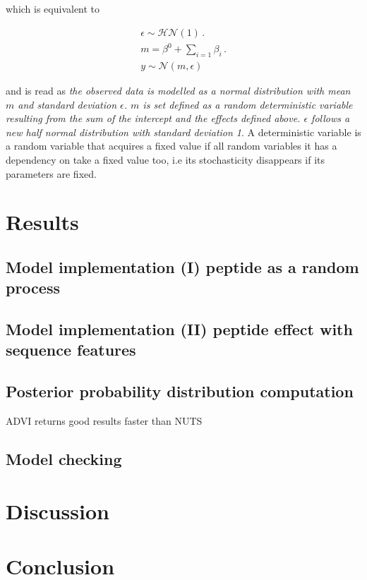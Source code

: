 which is equivalent to

\begin{align}
\nonumber \epsilon \sim \mathcal{HN}(1) \,. \\ 
m = \beta^0 + \sum_{i=1} \beta_i \,. \\ 
\nonumber y \sim \mathcal{N}(m, \epsilon)
\end{align}

and is read as \textit{the observed data is modelled as a normal distribution with mean $m$ and standard deviation $\epsilon$. $m$ is set defined as a random deterministic variable resulting from the sum of the intercept and the effects defined above. $\epsilon$ follows a new half normal distribution with standard deviation 1}. A deterministic variable is a random variable that acquires a fixed value if all random variables it has a dependency on take a fixed value too, i.e its stochasticity disappears if its parameters are fixed.

\section{Results}

\subsection{Model implementation (I) peptide as a random process}

\subsection{Model implementation (II) peptide effect with sequence features}

\subsection{Posterior probability distribution computation}

\ac{ADVI} returns good results faster than \ac{NUTS}

\subsection{Model checking}


\section{Discussion}



\section{Conclusion}


